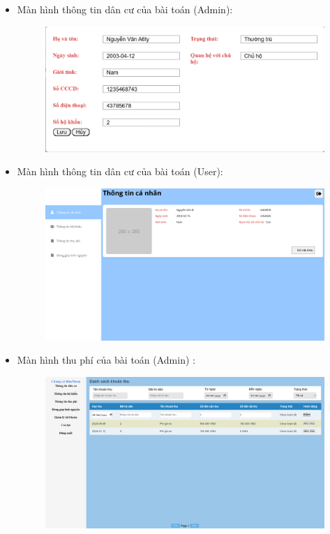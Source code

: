 \documentclass{article}
\begin{document}
\begin{itemize}
\begin{figure}[H]
    \end{figure}
    \vspace{1cm}
    \item Màn hình thông tin dân cư của bài toán (Admin):
    \begin{figure}[H]
        \centering
        \includegraphics[width=1\textwidth]{Ảnh chương 4/Thông tin cư dân Admin.png}
    \end{figure}
    \vspace{4cm}
    \item Màn hình thông tin dân cư của bài toán (User):
    \begin{figure}[H]
        \centering
        \includegraphics[width=1\textwidth]{Ảnh chương 4/Thông tin cư dân User.png}
    \end{figure}
    \vspace{2cm}
    \item Màn hình thu phí của bài toán (Admin) :
    \begin{figure}[H]
        \centering
        \includegraphics[width=1\textwidth]{Ảnh chương 4/Thông tin thu phí Admin.png}

\end{figure}
\end{itemize}
\end{document}
